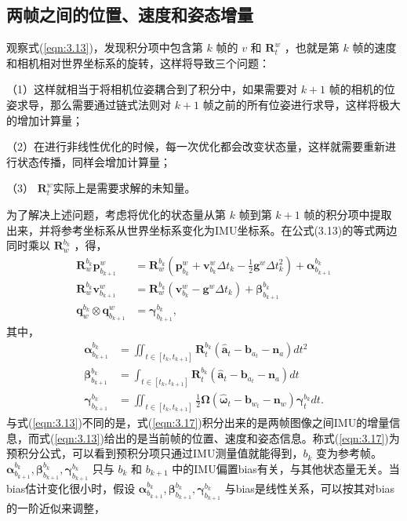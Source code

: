 \subsection{两帧之间的位置、速度和姿态增量}
观察式(\ref{eqn:3.13})，发现积分项中包含第 $k$  帧的 $v$ 和 $\mathbf{R}_t^w $ ，也就是第 $k$ 帧的速度和相机相对世界坐标系的旋转，这样将导致三个问题：

（1）这样就相当于将相机位姿耦合到了积分中，如果需要对 $k+1$ 帧的相机的位姿求导，那么需要通过链式法则对 $k+1$ 帧之前的所有位姿进行求导，这样将极大的增加计算量；

（2）在进行非线性优化的时候，每一次优化都会改变状态量，这样就需要重新进行状态传播，同样会增加计算量；

（3） $\mathbf{R}_t^w $实际上是需要求解的未知量。

为了解决上述问题，考虑将优化的状态量从第 $k$ 帧到第 $k+1$ 帧的积分项中提取出来，并将参考坐标系从世界坐标系变化为IMU坐标系。在公式(3.13)的等式两边同时乘以 $\mathbf{R}_w^{b_k} $ ，得，
\begin{equation}
\label{eqn:3.16}
\begin{split}
\mathbf{R}_w^{b_k}\mathbf{p}_{b_{k+1}}^w&=\mathbf{R}_w^{b_k}(\mathbf{p}_{b_k}^w+\mathbf{v}_{b_k}^w\Delta t_k -\frac{1}{2}\mathbf{g}^w\Delta {t_k^2})+\bm{\alpha}_{b_{k+1}}^{b_k} \\
\mathbf{R}_w^{b_k}\mathbf{v}_{b_{k+1}}^w&=\mathbf{R}_w^{b_k}(\mathbf{v}_{b_k}^w-\mathbf{g}^w\Delta t_k)+\bm{\beta}_{b_{k+1}}^{b_k} \\
\mathbf{q}_w^{b_k}\otimes\mathbf{q}_{b_{k+1}}^w&=\bm{\gamma}_{b_{k+1}}^{b_k},
\end{split}
\end{equation}
其中，
\begin{equation}
\label{eqn:3.17}
\begin{split}
\bm{\alpha}_{b_{k+1}}^{b_k}&=\iint_{t\in[t_k,t_{k+1}]}\mathbf{R}_t^{b_k}(\hat{\mathbf{a}}_t-\mathbf{b}_{a_t}-\mathbf{n}_a)dt^2 \\
\bm{\beta}_{b_{k+1}}^{b_k}&=\int_{t\in[t_k,t_{k+1}]}\mathbf{R}_t^{b_k}(\hat{\mathbf{a}}_t-\mathbf{b}_{a_t}-\mathbf{n}_a)dt \\
\bm{\gamma}_{b_{k+1}}^{b_k}&=\iint_{t\in[t_k,t_{k+1}]}\frac{1}{2}\bm{\Omega}(\hat{\bm{\omega}}_t-\mathbf{b}_{w_t}-\mathbf{n}_w)\bm{\gamma}_{t}^{b_k}dt.
\end{split}
\end{equation}
与式(\ref{eqn:3.13})不同的是，式(\ref{eqn:3.17})积分出来的是两帧图像之间IMU的增量信息，而式(\ref{eqn:3.13})给出的是当前帧的位置、速度和姿态信息。称式(\ref{eqn:3.17})为预积分公式，可以看到预积分项只通过IMU测量值就能得到，$b_k $ 变为参考帧。$\bm{\alpha}_{b_{k+1}}^{b_k},\bm{\beta}_{b_{k+1}}^{b_k}, \bm{\gamma}_{b_{k+1}}^{b_k}  $ 只与 $b_{k} $ 和 $b_{k+1} $ 中的IMU偏置bias有关，与其他状态量无关。当bias估计变化很小时，假设 $\bm{\alpha}_{b_{k+1}}^{b_k},\bm{\beta}_{b_{k+1}}^{b_k}, \bm{\gamma}_{b_{k+1}}^{b_k}  $ 与bias是线性关系，可以按其对bias的一阶近似来调整，
